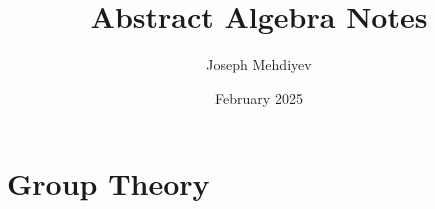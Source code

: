\documentclass[11pt]{scrreprt}
\begin{document}
\renewcommand{\figurename}{Image}

\title{Abstract Algebra Notes}
\author{Joseph Mehdiyev}
\date{February 2025}
\maketitle

\tableofcontents
\part{Group Theory}

\end{document}
